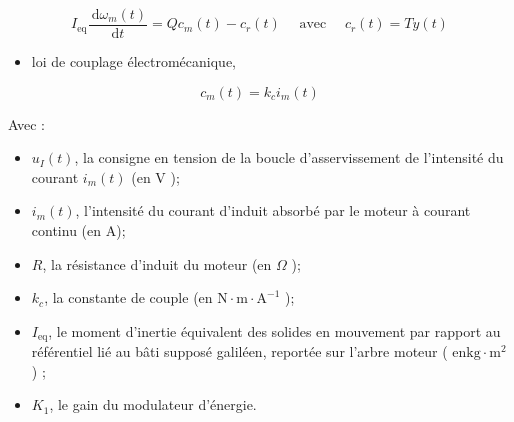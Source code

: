 \documentclass[10pt]{article}
\begin{document}
$$
I_{\mathrm{eq}} \frac{\mathrm{~d} \omega_{m}(t)}{\mathrm{d} t}=Q c_{m}(t)-c_{r}(t) \quad \text { avec } \quad c_{r}(t)=T y(t)
$$

\begin{itemize}
  \item loi de couplage électromécanique,
\end{itemize}

$$
c_{m}(t)=k_{c} i_{m}(t)
$$

Avec :

\begin{itemize}
  \item $u_{I}(t)$, la consigne en tension de la boucle d'asservissement de l'intensité du courant $i_{m}(t)$ (en V );
  \item $i_{m}(t)$, l'intensité du courant d'induit absorbé par le moteur à courant continu (en A);
  \item $R$, la résistance d'induit du moteur (en $\Omega$ );
  \item $k_{c}$, la constante de couple (en $\mathrm{N} \cdot \mathrm{m} \cdot \mathrm{A}^{-1}$ );
  \item $I_{\mathrm{eq}}$, le moment d'inertie équivalent des solides en mouvement par rapport au référentiel lié au bâti supposé galiléen, reportée sur l'arbre moteur ( $\mathrm{en} \mathrm{kg} \cdot \mathrm{m}^{2}$ ) ;
  \item $K_{1}$, le gain du modulateur d'énergie.
\end{itemize}
\end{document}
